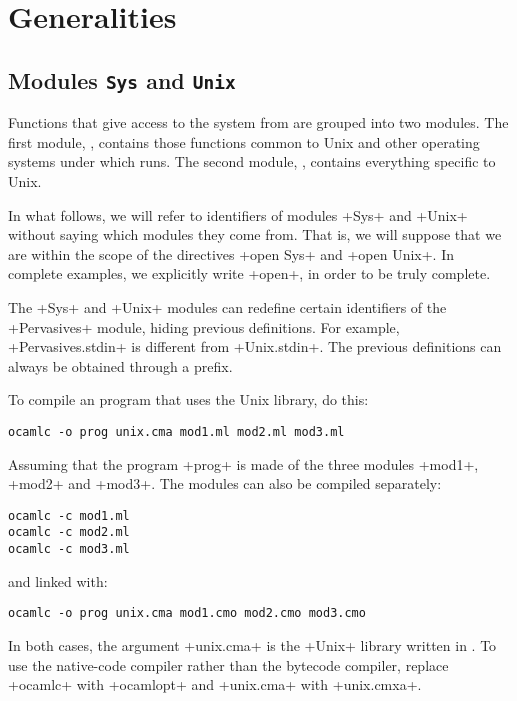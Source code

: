 %
%

\chapter{Generalities}

\section{Modules {\normalfont\texttt{Sys}} and {\normalfont\texttt{Unix}}}

Functions that give access to the system from {\ocaml} are grouped into two
modules. The first module,  , contains those functions
common to Unix and other operating systems under which {\ocaml} runs.
The second module, , contains everything specific to
Unix. 

In what follows, we will refer to identifiers of modules \ml+Sys+ and
\ml+Unix+ without saying which modules they come from.  That is, we
will suppose that we are within the scope of the directives 
\ml+open Sys+ and \ml+open Unix+. In complete examples, we explicitly write
\ml+open+, in order to be truly complete.

The \ml+Sys+ and \ml+Unix+ modules can redefine certain
identifiers of the \ml+Pervasives+ module, hiding previous
definitions. For example,  \ml+Pervasives.stdin+  is different from 
\ml+Unix.stdin+. The previous definitions can always be obtained
through a prefix.

To compile an {\ocaml} program that uses the 
Unix library, do this:
%
\begin{lstlisting}
ocamlc -o prog unix.cma mod1.ml mod2.ml mod3.ml 
\end{lstlisting}
%
Assuming that the program  \ml+prog+ is made of the three modules  \ml+mod1+,
\ml+mod2+ and \ml+mod3+. The modules can also be compiled separately:
%
\begin{lstlisting}
ocamlc -c mod1.ml
ocamlc -c mod2.ml
ocamlc -c mod3.ml
\end{lstlisting}
%
and linked with:
%
\begin{lstlisting}
ocamlc -o prog unix.cma mod1.cmo mod2.cmo mod3.cmo
\end{lstlisting}
%
In both cases, the argument \ml+unix.cma+ is the \ml+Unix+ library
written in {\ocaml}. To use the native-code compiler rather than the
bytecode compiler, replace \ml+ocamlc+ with \ml+ocamlopt+ and
\ml+unix.cma+ with \ml+unix.cmxa+.


